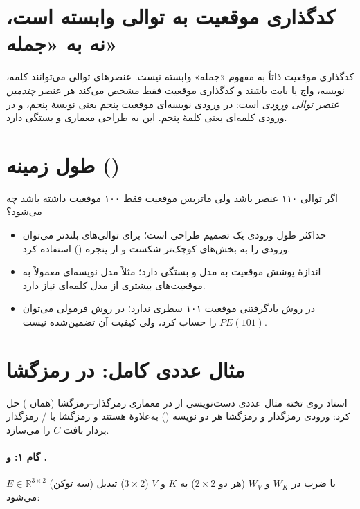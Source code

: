 \section{کدگذاری موقعیت به توالی وابسته است، نه به «جمله»}
کدگذاری موقعیت ذاتاً به مفهوم «جمله» وابسته نیست. عنصرهای توالی می‌توانند کلمه، نویسه، واج یا بایت باشند و کدگذاری موقعیت فقط مشخص می‌کند هر عنصر \emph{چندمین عنصر توالی ورودی} است: در ورودی نویسه‌ای موقعیت پنجم یعنی نویسهٔ پنجم، و در ورودی کلمه‌ای یعنی کلمهٔ پنجم. این به طراحی معماری و  بستگی دارد.

\section{طول زمینه ()}
اگر توالی ۱۱۰ عنصر باشد ولی ماتریس موقعیت فقط ۱۰۰ موقعیت داشته باشد چه می‌شود؟
\begin{itemize}
  \item حداکثر طول ورودی یک تصمیم طراحی است؛ برای توالی‌های بلندتر می‌توان ورودی را به بخش‌های کوچک‌تر شکست و از پنجره () استفاده کرد.
  \item اندازهٔ پوشش موقعیت به مدل و  بستگی دارد؛ مثلاً مدل نویسه‌ای معمولاً به موقعیت‌های بیشتری از مدل کلمه‌ای نیاز دارد.
  \item در روش یادگرفتنی موقعیت ۱۰۱ سطری ندارد؛ در روش فرمولی می‌توان $PE(101)$ را حساب کرد، ولی کیفیت آن تضمین‌شده نیست.
\end{itemize}

\section{مثال عددی کامل:  در رمزگشا}
\label{sec:ch10-example}
استاد روی تخته مثال عددی دست‌نویسی از  در معماری رمزگذار--رمزگشا (همان ) حل کرد: ورودی رمزگذار و رمزگشا هر دو  نویسه () به‌علاوهٔ  هستند و  رمزگشا با / رمزگذار بردار بافت $C$ را می‌سازد.

\paragraph{گام ۱:  و .} $E\in\mathbb{R}^{3\times 2}$ (سه توکن) با ضرب در $W_K$ و $W_V$ (هر دو $2\times2$) به $K$ و $V$ ($3\times2$) تبدیل می‌شود:

